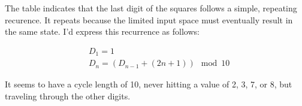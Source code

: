 The table indicates that the last digit of the squares follows a simple, repeating recurence.  It repeats because
the limited input space must eventually result in the same state.  I'd express this recurrence as follows:

\begin{align*}
&D_1 = 1 \\
&D_n = (D_{n - 1} + (2n + 1)) \mod 10
\end{align*}

It seems to have a cycle length of 10, never hitting a value of 2, 3, 7, or 8, but traveling through the other digits.